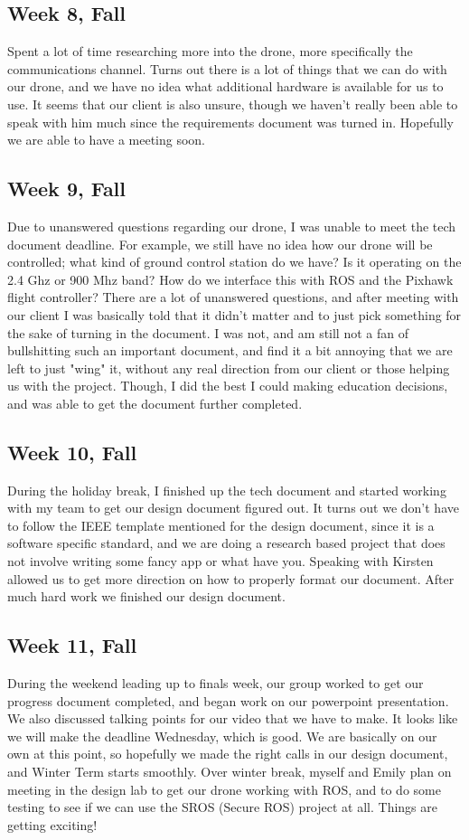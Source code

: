\documentclass[IEEEtran,letterpaper,10pt,notitlepage,draftclsnofoot,onecolumn]{article}
\begin{document}
\begin{sloppypar}
\subsection{Week 8, Fall}
Spent a lot of time researching more into the drone, more specifically the communications channel. Turns out there is a lot of things that we can do with our drone, and we have no idea what additional hardware is available for us to use. It seems that our client is also unsure, though we haven't really been able to speak with him much since the requirements document was turned in. Hopefully we are able to have a meeting soon.
\subsection{Week 9, Fall}
Due to unanswered questions regarding our drone, I was unable to meet the tech document deadline. For example, we still have no idea how our drone will be controlled; what kind of ground control station do we have? Is it operating on the 2.4 Ghz or 900 Mhz band? How do we interface this with ROS and the Pixhawk flight controller? There are a lot of unanswered questions, and after meeting with our client I was basically told that it didn't matter and to just pick something for the sake of turning in the document. I was not, and am still not a fan of bullshitting such an important document, and find it a bit annoying that we are left to just "wing" it, without any real direction from our client or those helping us with the project. Though, I did the best I could making education decisions, and was able to get the document further completed.
\subsection{Week 10, Fall}
During the holiday break, I finished up the tech document and started working with my team to get our design document figured out. It turns out we don't have to follow the IEEE template mentioned for the design document, since it is a software specific standard, and we are doing a research based project that does not involve writing some fancy app or what have you. Speaking with Kirsten allowed us to get more direction on how to properly format our document. After much hard work we finished our design document.
\subsection{Week 11, Fall}
During the weekend leading up to finals week, our group worked to get our progress document completed, and began work on our powerpoint presentation. We also discussed talking points for our video that we have to make. It looks like we will make the deadline Wednesday, which is good. We are basically on our own at this point, so hopefully we made the right calls in our design document, and Winter Term starts smoothly. Over winter break, myself and Emily plan on meeting in the design lab to get our drone working with ROS, and to do some testing to see if we can use the SROS (Secure ROS) project at all. Things are getting exciting!

\end{sloppypar}
\end{document}
